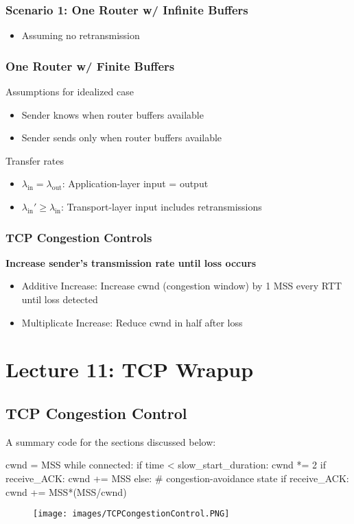 \documentclass[a4paper]{article}
\begin{document}
\subsubsection{Scenario 1: One Router w/ Infinite Buffers}
\begin{itemize}
    \item Assuming no retransmission
\end{itemize}

\subsubsection{One Router w/ Finite Buffers}
Assumptions for idealized case
\begin{itemize}
    \item Sender knows when router buffers available
    \item Sender sends only when router buffers available
\end{itemize}
Transfer rates
\begin{itemize}
    \item $\lambda_{\text{in}} = \lambda_{\text{out}}$: Application-layer input = output
    \item $\lambda_{\text{in}}' \geq \lambda_{\text{in}}$: Transport-layer input includes retransmissions
\end{itemize}

\subsubsection{TCP Congestion Controls}
\noindent\textbf{Increase sender's transmission rate until loss occurs}
\begin{itemize}
    \item Additive Increase: Increase cwnd (congestion window) by 1 MSS every RTT until loss detected
    \item Multiplicate Increase: Reduce cwnd in half after loss
\end{itemize}

\newpage
\section{Lecture 11: TCP Wrapup}
\subsection{TCP Congestion Control}
A summary code for the sections discussed below:
\begin{python}
    cwnd = MSS
    while connected:
    if time < slow_start_duration:
        cwnd *= 2
        if receive_ACK: 
        cwnd += MSS
    else: # congestion-avoidance state
        if receive_ACK:
        cwnd += MSS*(MSS/cwnd)
\end{python}
\begin{figure}[H]
    \centering
    \texttt{[image: images/TCPCongestionControl.PNG]}
\end{figure}
\end{document}
